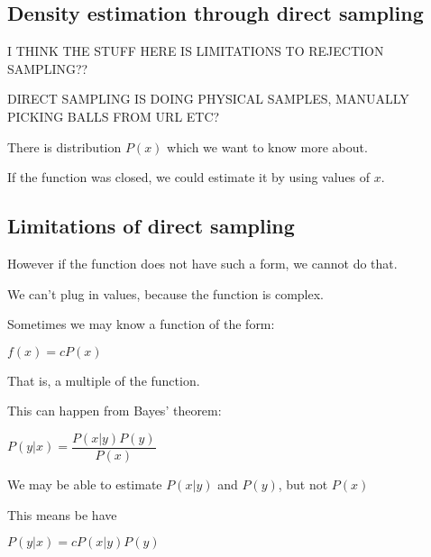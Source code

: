 
\subsection{Density estimation through direct sampling}

I THINK THE STUFF HERE IS LIMITATIONS TO REJECTION SAMPLING??

DIRECT SAMPLING IS DOING PHYSICAL SAMPLES, MANUALLY PICKING BALLS FROM URL ETC?

There is distribution \(P(x)\) which we want to know more about.

If the function was closed, we could estimate it by using values of \(x\).

\subsection{Limitations of direct sampling}

However if the function does not have such a form, we cannot do that.

We can't plug in values, because the function is complex.

Sometimes we may know a function of the form:

\(f(x)=cP(x)\)

That is, a multiple of the function.

This can happen from Bayes' theorem:

\(P(y|x)=\dfrac{P(x|y)P(y)}{P(x)}\)

We may be able to estimate \(P(x|y)\) and \(P(y)\), but not \(P(x)\)

This means be have 

\(P(y|x)=cP(x|y)P(y)\)

